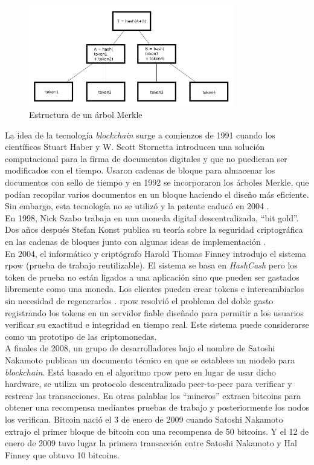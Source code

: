 \begin{figure}[H]
	\centering
	\includegraphics[width=0.8\textwidth]{figuras/arbol_merkle.png}
	\caption{Estructura de un árbol Merkle \cite{img-arbol-merkle}}
	\label{fig:arbol-Merkle}
\end{figure}

La idea de la tecnología \textit{blockchain} surge a comienzos de 1991 cuando los científicos Stuart Haber y W. Scott Stornetta introducen una solución computacional para la firma de documentos digitales y que no puedieran ser modificados con el tiempo. Usaron cadenas de bloque para almacenar los documentos con sello de tiempo y en 1992 se incorporaron los árboles Merkle, que podían recopilar varios documentos en un bloque haciendo el diseño más eficiente. Sin embargo, esta tecnología no se utilizó y la patente caducó en 2004 \cite{historia1-block}.\\

En 1998, Nick Szabo trabaja en una moneda digital descentralizada, ``bit gold''. Dos años después Stefan Konst publica su teoría sobre la seguridad criptográfica en las cadenas de bloques junto con algunas ideas de implementación \cite{historia2-block}.\\

En 2004, el informático y criptógrafo Harold Thomas Finney introdujo el sistema \acrshort{rpow} (prueba de trabajo reutilizable). El sistema se basa en \textit{HashCash} pero los token de prueba no están ligados a una aplicación sino que pueden ser gastados libremente como una moneda. Los clientes pueden crear tokens e intercambiarlos sin necesidad de regenerarlos \cite{RPoW}. \acrshort{rpow} resolvió el problema del doble gasto registrando los tokens en un servidor fiable diseñado para permitir a los usuarios verificar su exactitud e integridad en tiempo real. Este sistema puede considerarse como un prototipo de las criptomonedas.\\

A finales de 2008, un grupo de desarrolladores bajo el nombre de Satoshi Nakamoto publican un documento técnico en que se establece un modelo para \textit{blockchain}. Está basado en el algoritmo \acrshort{rpow} pero en lugar de usar dicho hardware, se utiliza un protocolo descentralizado peer-to-peer para verificar y restrear las transacciones. En otras palablas los ``mineros'' extraen bitcoins para obtener una recompensa mediantes pruebas de trabajo y posteriormente los nodos los verifican. Bitcoin nació el 3 de enero de 2009 cuando Satoshi Nakamoto extrajo el primer bloque de bitcoin con una recompensa de 50 bitcoins. Y el 12 de enero de 2009 tuvo lugar la primera transacción entre Satoshi Nakamoto y Hal Finney que obtuvo 10 bitcoins.\\



